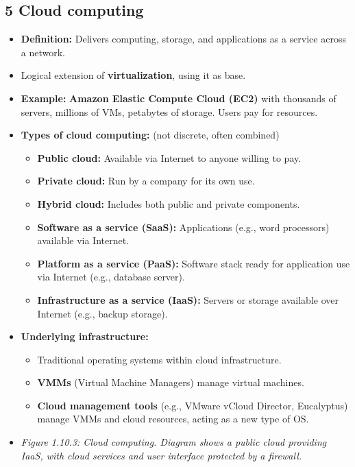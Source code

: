 \documentclass{article}
\begin{document}
\subsection*{5 Cloud computing}
\begin{itemize}
    \item \textbf{Definition:} Delivers computing, storage, and applications as a service across a network.
    \item Logical extension of \textbf{virtualization}, using it as base.
    \item \textbf{Example:} \textbf{Amazon Elastic Compute Cloud (EC2)} with thousands of servers, millions of VMs, petabytes of storage. Users pay for resources.
    \item \textbf{Types of cloud computing:} (not discrete, often combined)
    \begin{itemize}
        \item \textbf{Public cloud:} Available via Internet to anyone willing to pay.
        \item \textbf{Private cloud:} Run by a company for its own use.
        \item \textbf{Hybrid cloud:} Includes both public and private components.
        \item \textbf{Software as a service (SaaS):} Applications (e.g., word processors) available via Internet.
        \item \textbf{Platform as a service (PaaS):} Software stack ready for application use via Internet (e.g., database server).
        \item \textbf{Infrastructure as a service (IaaS):} Servers or storage available over Internet (e.g., backup storage).
    \end{itemize}
    \item \textbf{Underlying infrastructure:}
    \begin{itemize}
        \item Traditional operating systems within cloud infrastructure.
        \item \textbf{VMMs} (Virtual Machine Managers) manage virtual machines.
        \item \textbf{Cloud management tools} (e.g., VMware vCloud Director, Eucalyptus) manage VMMs and cloud resources, acting as a new type of OS.
    \end{itemize}
    \item \textit{Figure 1.10.3: Cloud computing. Diagram shows a public cloud providing IaaS, with cloud services and user interface protected by a firewall.}
\end{itemize}
\end{document}
